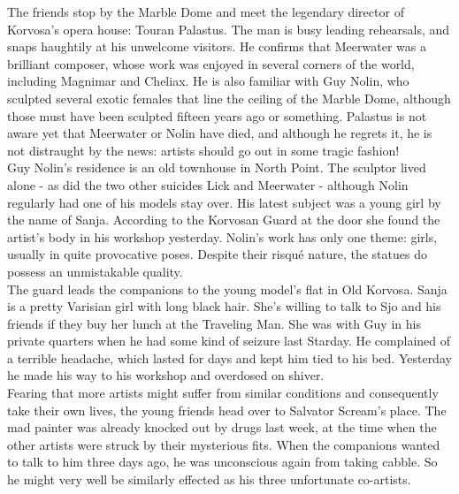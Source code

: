 The friends stop by the Marble Dome and meet the legendary director of Korvosa's opera house: Touran Palastus. The man is busy leading rehearsals, and snaps haughtily at his unwelcome visitors. He confirms that Meerwater was a brilliant composer, whose work was enjoyed in several corners of the world, including Magnimar and Cheliax. He is also familiar with Guy Nolin, who sculpted several exotic females that line the ceiling of the Marble Dome, although those must have been sculpted fifteen years ago or something. Palastus is not aware yet that Meerwater or Nolin have died, and although he regrets it, he is not distraught by the news: artists should go out in some tragic fashion!\\

Guy Nolin's residence is an old townhouse in North Point. The sculptor lived alone - as did the two other suicides Lick and Meerwater - although Nolin regularly had one of his models stay over. His latest subject was a young girl by the name of Sanja. According to the Korvosan Guard at the door she found the artist's body in his workshop yesterday. Nolin's work has only one theme: girls, usually in quite provocative poses. Despite their risqu\'e nature, the statues do possess an unmistakable quality.\\

The guard leads the companions to the young model's flat in Old Korvosa. Sanja is a pretty Varisian girl with long black hair. She's willing to talk to Sjo and his friends if they buy her lunch at the Traveling Man. She was with Guy in his private quarters when he had some kind of seizure last Starday. He complained of a terrible headache, which lasted for days and kept him tied to his bed. Yesterday he made his way to his workshop and overdosed on shiver.\\

Fearing that more artists might suffer from similar conditions and consequently take their own lives, the young friends head over to Salvator Scream's place. The mad painter was already knocked out by drugs last week, at the time when the other artists were struck by their mysterious fits. When the companions wanted to talk to him three days ago, he was unconscious again from taking cabble. So he might very well be similarly effected as his three unfortunate co-artists.\\

